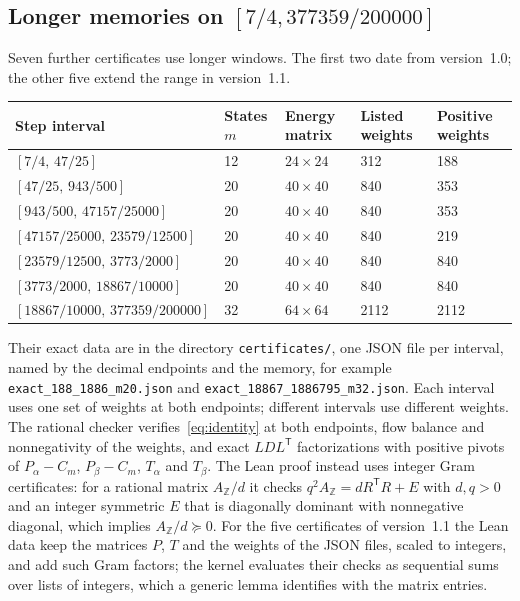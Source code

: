 \documentclass[11pt]{article}
\numberwithin{equation}{section}
\theoremstyle{definition}
\theoremstyle{remark}
\newcommand{\lean}[1]{{\urlstyle{tt}\nolinkurl{#1}}}
\newcommand{\taulo}{943/500}
\newcommand{\taunew}{377359/200000}
\begin{document}
\subsection{Longer memories on \texorpdfstring{$[7/4,\taunew]$}{[7/4, 377359/200000]}}
Seven further certificates use longer windows. The first two date from version~1.0; the other five extend the range in version~1.1.
\begin{center}
\begin{tabular}{@{}lllll@{}}
\toprule
Step interval&States $m$&Energy matrix&Listed weights&Positive weights\\
\midrule
$[7/4,\,47/25]$&12&$24\times24$&312&188\\
$[47/25,\,\taulo]$&20&$40\times40$&840&353\\
$[\taulo,\,47157/25000]$&20&$40\times40$&840&353\\
$[47157/25000,\,23579/12500]$&20&$40\times40$&840&219\\
$[23579/12500,\,3773/2000]$&20&$40\times40$&840&840\\
$[3773/2000,\,18867/10000]$&20&$40\times40$&840&840\\
$[18867/10000,\,\taunew]$&32&$64\times64$&2112&2112\\
\bottomrule
\end{tabular}
\end{center}
Their exact data are in the directory \lean{certificates/}, one JSON file per interval, named by the decimal endpoints and the memory, for example \lean{exact_188_1886_m20.json} and \lean{exact_18867_1886795_m32.json}. Each interval uses one set of weights at both endpoints; different intervals use different weights. The rational checker verifies~\eqref{eq:identity} at both endpoints, flow balance and nonnegativity of the weights, and exact $LDL^{\mathsf T}$ factorizations with positive pivots of $P_\alpha-C_m$, $P_\beta-C_m$, $T_\alpha$ and $T_\beta$. The Lean proof instead uses integer Gram certificates: for a rational matrix $A_{\mathbb Z}/d$ it checks $q^2A_{\mathbb Z}=dR^{\mathsf T}R+E$ with $d,q>0$ and an integer symmetric $E$ that is diagonally dominant with nonnegative diagonal, which implies $A_{\mathbb Z}/d\succeq0$. For the five certificates of version~1.1 the Lean data keep the matrices $P$, $T$ and the weights of the JSON files, scaled to integers, and add such Gram factors; the kernel evaluates their checks as sequential sums over lists of integers, which a generic lemma identifies with the matrix entries.
\end{document}
